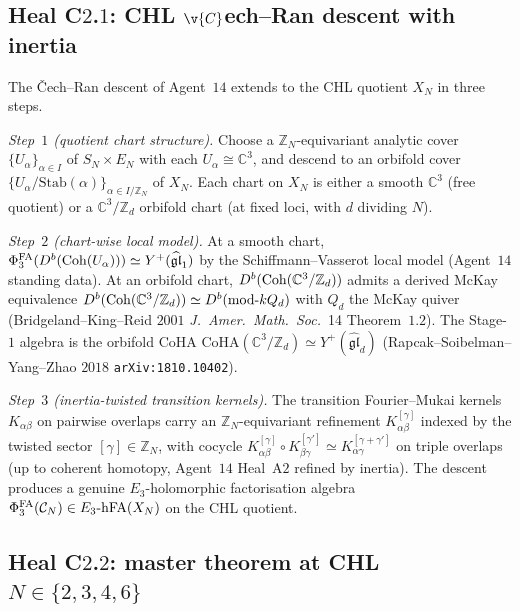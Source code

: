 \subsection*{Heal C$2$.$1$: CHL $\v{C}$ech--Ran descent with inertia}

The \v{C}ech--Ran descent of Agent~$14$ extends to the CHL quotient
$X_N$ in three steps.

\emph{Step~$1$ (quotient chart structure).} Choose a $\mathbb{Z}_N$-equivariant
analytic cover $\{U_\alpha\}_{\alpha \in I}$ of $S_N \times E_N$ with
each $U_\alpha \cong \mathbb{C}^3$, and descend to an orbifold cover
$\{U_\alpha / \mathrm{Stab}(\alpha)\}_{\alpha \in I / \mathbb{Z}_N}$ of
$X_N$. Each chart on $X_N$ is either a smooth $\mathbb{C}^3$ (free
quotient) or a $\mathbb{C}^3 / \mathbb{Z}_d$ orbifold chart (at fixed
loci, with $d$ dividing $N$).

\emph{Step~$2$ (chart-wise local model).} At a smooth chart,
$\Phi^{\mathrm{FA}}_{3}(D^b(\mathrm{Coh}(U_\alpha))) \simeq Y^+(\widehat{\mathfrak{gl}}_1)$ by
the Schiffmann--Vasserot local model (Agent~$14$ standing data). At an
orbifold chart, $D^b(\mathrm{Coh}(\mathbb{C}^3 / \mathbb{Z}_d))$ admits a derived
McKay equivalence $D^b(\mathrm{Coh}(\mathbb{C}^3 / \mathbb{Z}_d)) \simeq
D^b(\mathrm{mod}\text{-}k Q_d)$ with $Q_d$ the McKay quiver
(Bridgeland--King--Reid $2001$ \emph{J.~Amer.~Math.~Soc.}~14
Theorem~$1.2$). The Stage-$1$ algebra is the orbifold CoHA
$\mathrm{CoHA}(\mathbb{C}^3 / \mathbb{Z}_d) \simeq Y^+(\widehat{\mathfrak{gl}}_d)$
(Rapcak--Soibelman--Yang--Zhao $2018$ \texttt{arXiv:1810.10402}).

\emph{Step~$3$ (inertia-twisted transition kernels).} The transition
Fourier--Mukai kernels $K_{\alpha\beta}$ on pairwise overlaps carry an
$\mathbb{Z}_N$-equivariant refinement $K_{\alpha\beta}^{[\gamma]}$ indexed
by the twisted sector $[\gamma] \in \mathbb{Z}_N$, with cocycle
$K_{\alpha\beta}^{[\gamma]} \circ K_{\beta\gamma}^{[\gamma']} \simeq
K_{\alpha\gamma}^{[\gamma + \gamma']}$ on triple overlaps (up to coherent
homotopy, Agent~$14$ Heal~A$2$ refined by inertia). The descent
produces a genuine $E_3$-holomorphic factorisation algebra
$\Phi^{\mathrm{FA}}_{3}(\mathcal{C}_N) \in E_{3}\text{-}\mathrm{hFA}(X_N)$ on the CHL quotient.

\subsection*{Heal C$2$.$2$: master theorem at CHL $N \in \{2, 3, 4, 6\}$}

